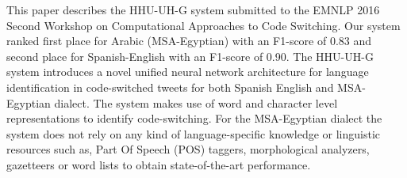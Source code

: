 This paper describes the HHU-UH-G system submitted to the EMNLP 2016 Second Workshop on Computational Approaches to Code Switching. Our system ranked first place for Arabic (MSA-Egyptian) with an F1-score of 0.83 and second place for Spanish-English with an F1-score of 0.90. The HHU-UH-G system introduces a novel unified neural network architecture for language identification in code-switched tweets for both Spanish English and MSA-Egyptian dialect. The system makes use of word and character level representations to identify code-switching. For the MSA-Egyptian dialect the system does not rely on any kind of language-specific knowledge or linguistic resources such as, Part Of Speech (POS) taggers, morphological analyzers, gazetteers or word lists to obtain state-of-the-art performance.
